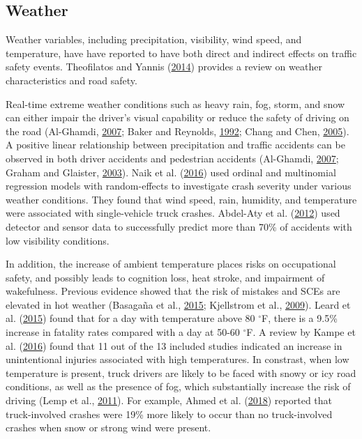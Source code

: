 \documentclass[12pt]{book}
\numberwithin{equation}{chapter}
\begin{document}
\hypertarget{weather}{%
\subsection{Weather}\label{weather}}

Weather variables, including precipitation, visibility, wind speed, and temperature, have have reported to have both direct and indirect effects on traffic safety events. Theofilatos and Yannis (\protect\hyperlink{ref-theofilatos2014review}{2014}) provides a review on weather characteristics and road safety.

Real-time extreme weather conditions such as heavy rain, fog, storm, and snow can either impair the driver's visual capability or reduce the safety of driving on the road (Al-Ghamdi, \protect\hyperlink{ref-al2007experimental}{2007}; Baker and Reynolds, \protect\hyperlink{ref-baker1992wind}{1992}; Chang and Chen, \protect\hyperlink{ref-chang2005data}{2005}). A positive linear relationship between precipitation and traffic accidents can be observed in both driver accidents and pedestrian accidents (Al-Ghamdi, \protect\hyperlink{ref-al2007experimental}{2007}; Graham and Glaister, \protect\hyperlink{ref-graham2003spatial}{2003}). Naik et al. (\protect\hyperlink{ref-naik2016weather}{2016}) used ordinal and multinomial regression models with random-effects to investigate crash severity under various weather conditions. They found that wind speed, rain, humidity, and temperature were associated with single-vehicle truck crashes. Abdel-Aty et al. (\protect\hyperlink{ref-abdel2012real}{2012}) used detector and sensor data to successfully predict more than 70\% of accidents with low visibility conditions.

In addition, the increase of ambient temperature places risks on occupational safety, and possibly leads to cognition loss, heat stroke, and impairment of wakefulness. Previous evidence showed that the risk of mistakes and SCEs are elevated in hot weather (Basagaña et al., \protect\hyperlink{ref-basagana2015high}{2015}; Kjellstrom et al., \protect\hyperlink{ref-kjellstrom2009direct}{2009}). Leard et al. (\protect\hyperlink{ref-leard2015weather}{2015}) found that for a day with temperature above 80 \(^{\circ}\)F, there is a 9.5\% increase in fatality rates compared with a day at 50-60 \(^{\circ}\)F. A review by Kampe et al. (\protect\hyperlink{ref-im2016impact}{2016}) found that 11 out of the 13 included studies indicated an increase in unintentional injuries associated with high temperatures. In constrast, when low temperature is present, truck drivers are likely to be faced with snowy or icy road conditions, as well as the presence of fog, which substantially increase the risk of driving (Lemp et al., \protect\hyperlink{ref-lemp2011analysis}{2011}). For example, Ahmed et al. (\protect\hyperlink{ref-ahmed2018effects}{2018}) reported that truck-involved crashes were 19\% more likely to occur than no truck-involved crashes when snow or strong wind were present.
\end{document}
